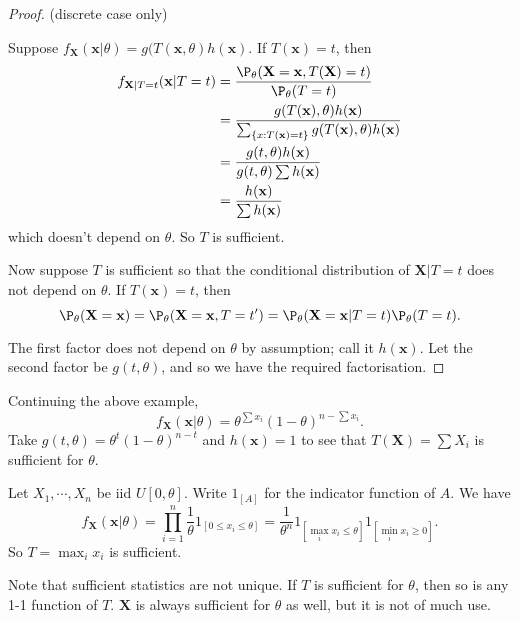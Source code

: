 \documentclass[a4paper]{article}
\begin{document}
\begin{proof}
  (discrete case only)

  Suppose $f_\mathbf{X}(\mathbf{x}|\theta) = g(T(\mathbf{x}, \theta)h(\mathbf{x})$. If $T(\mathbf{x}) = t$, then
  \begin{align*}
    f_{\mathbf{X}|T = t}(\mathbf{x}|T = t) &= \frac{\P_\theta(\mathbf{X} = \mathbf{x}, T(\mathbf{X}) = t)}{\P_\theta (T = t)}\\
    &= \frac{g(T(\mathbf{x}), \theta)h(\mathbf{x})}{\sum_{\{x:T(\mathbf{x}) = t\}}g(T(\mathbf{x}), \theta)h(\mathbf{x})}\\
    &=\frac{g(t, \theta)h(\mathbf{x})}{g(t, \theta)\sum h(\mathbf{x})}\\
    &= \frac{h(\mathbf{x})}{\sum h(\mathbf{x})}
  \end{align*}
  which doesn't depend on $\theta$. So $T$ is sufficient.

  Now suppose $T$ is sufficient so that the conditional distribution of $\mathbf{X}|T = t$ does not depend on $\theta$. If $T(\mathbf{x}) = t$, then
  \[
    \P_\theta(\mathbf{X} = \mathbf{x}) = \P_\theta(\mathbf{X} = \mathbf{x}, T=t') = \P_\theta(\mathbf{X} = \mathbf{x}|T = t)\P_\theta (T = t).
  \]

  The first factor does not depend on $\theta$ by assumption; call it $h(\mathbf{x})$. Let the second factor be $g(t, \theta)$, and so we have the required factorisation.
\end{proof}

\begin{eg}
  Continuing the above example,
  \[
    f_\mathbf{X}(\mathbf{x}|\theta) = \theta^{\sum x_i}(1 - \theta)^{n - \sum x_i}.
  \]
  Take $g(t, \theta) = \theta^t(1 - \theta)^{n - t}$ and $h(\mathbf{x}) = 1$ to see that $T(\mathbf{X}) = \sum X_i$ is sufficient for $\theta$.
\end{eg}

\begin{eg}
  Let $X_1, \cdots, X_n$ be iid $U[0, \theta]$. Write $1_{[A]}$ for the indicator function of $A$. We have
  \[
    f_\mathbf{X}(\mathbf{x}|\theta) = \prod_{i = 1}^n \frac{1}{\theta}1_{[0 \leq x_i\leq \theta]} = \frac{1}{\theta^n}1_{[\max_i x_i \leq \theta]}1_{[\min_i x_i\geq 0]}.
  \]
  So $T = \max_i x_i$ is sufficient.
\end{eg}

Note that sufficient statistics are not unique. If $T$ is sufficient for $\theta$, then so is any 1-1 function of $T$. $\mathbf{X}$ is always sufficient for $\theta$ as well, but it is not of much use.
\end{document}
